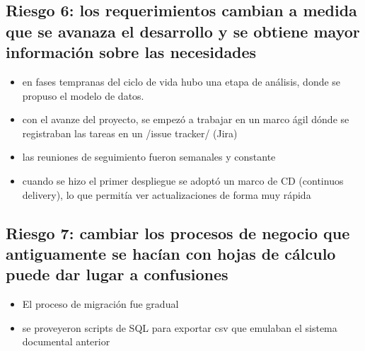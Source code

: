 \documentclass[letterpaper,10pt,spanish]{sphinxmanual}
\begin{document}
\subsection{Riesgo 6: los requerimientos cambian a medida que se avanaza el desarrollo y se obtiene mayor información sobre las necesidades}
\label{\detokenize{requerimientos/resumen_validacion:riesgo-6-los-requerimientos-cambian-a-medida-que-se-avanaza-el-desarrollo-y-se-obtiene-mayor-informacion-sobre-las-necesidades}}\begin{itemize}
\item {} 
en fases tempranas del ciclo de vida hubo una etapa de análisis, donde se propuso el modelo de datos.

\item {} 
con el avanze del proyecto, se empezó a trabajar en  un marco ágil dónde se registraban las tareas en un /issue tracker/ (Jira)

\item {} 
las reuniones de seguimiento fueron semanales y constante

\item {} 
cuando se hizo el primer despliegue se adoptó un marco de CD (continuos delivery), lo que permitía ver actualizaciones de forma muy rápida

\end{itemize}


\subsection{Riesgo 7: cambiar los procesos de negocio que antiguamente se hacían con hojas de cálculo puede dar lugar a confusiones}
\label{\detokenize{requerimientos/resumen_validacion:riesgo-7-cambiar-los-procesos-de-negocio-que-antiguamente-se-hacian-con-hojas-de-calculo-puede-dar-lugar-a-confusiones}}\begin{itemize}
\item {} 
El proceso de migración fue gradual

\item {} 
se proveyeron scripts de SQL para exportar csv que emulaban el sistema documental anterior

\end{itemize}
\end{document}
